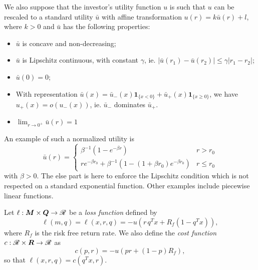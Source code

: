 \documentclass[11pt]{article}
\begin{document}
\begin{assumption}
  We also suppose that the investor's utility function $u$ is such that $u$ can be
  rescaled to a standard utility $\bar u$ with affine transformation
  $u(r) = k\bar u(r) + l$, where $k>0$ and $\bar u$ has the following properties:
  \begin{itemize}
  \item $\bar u$ is concave and non-decreasing;
  \item $\bar u$ is Lipschitz continuous, with constant $\gamma$, ie.
    $|\bar u(r_1) - \bar u(r_2)| \leq \gamma|r_1-r_2|$; 
  \item $\bar u(0) = 0$;
  \item With representation
    $\bar u(x) = \bar u_-(x)\bm1_{\{x<0\}}+\bar u_+(x)\bm 1_{\{x\geq 0\}}$, we have
    $u_+(x) = o(u_-(x))$, ie. $\bar u_-$ dominates $\bar u_+$. 
  \item $\lim_{r\to 0^{+}} \bar u(r) = 1$ 
  \end{itemize}

  An example of such a normalized utility is 
  \begin{equation*}
    \bar u(r) = \begin{cases}
      \beta^{-1}(1-e^{-\beta r}) & r > r_0\\
      re^{-\beta r_0} + \beta^{-1}(1-(1+\beta r_0)e^{-\beta r_0}) & r \leq r_0
    \end{cases}
  \end{equation*}
  with $\beta>0$. The else part is here to enforce the Lipschitz condition which is not
  respected on a standard exponential function. Other examples include piecewise linear
  functions.
\end{assumption}

\begin{deff}
  Let $\ell:\bm M\times \bm Q\to\mathscr{R}$ be a \textsl{loss function} defined by
  \begin{equation*}
    \ell(m,q) = \ell(x,r,q) = -u(r\,q^{T}x + R_f (1 - q^{T}x)),
  \end{equation*}
  where $R_f$ is the risk free return rate. We also define the \textsl{cost function}
  $c:\mathscr{R}\times\bm R\to\mathscr{R}$ as
  \begin{equation*}
    c(p,r) = -u(pr + (1-p)R_f),
  \end{equation*}
  so that $\ell(x,r,q) = c(q^Tx,r)$. 
\end{deff}
\end{document}

